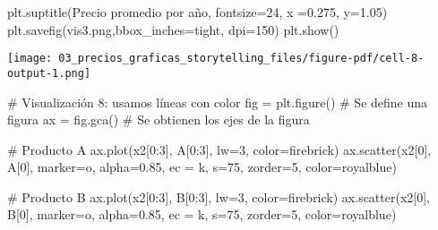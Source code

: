 \documentclass[
  letterpaper,
  DIV=11,
  numbers=noendperiod]{scrreprt}
\newenvironment{Shaded}{\begin{snugshade}}{\end{snugshade}}
\newcommand{\CommentTok}[1]{\textcolor[rgb]{0.37,0.37,0.37}{#1}}
\newcommand{\DecValTok}[1]{\textcolor[rgb]{0.68,0.00,0.00}{#1}}
\newcommand{\FloatTok}[1]{\textcolor[rgb]{0.68,0.00,0.00}{#1}}
\newcommand{\NormalTok}[1]{\textcolor[rgb]{0.00,0.23,0.31}{#1}}
\newcommand{\OperatorTok}[1]{\textcolor[rgb]{0.37,0.37,0.37}{#1}}
\newcommand{\StringTok}[1]{\textcolor[rgb]{0.13,0.47,0.30}{#1}}
\begin{document}
\begin{Shaded}
\begin{Highlighting}[]
\NormalTok{plt.suptitle(}\StringTok{\textquotesingle{}Precio promedio por año\textquotesingle{}}\NormalTok{, fontsize}\OperatorTok{=}\DecValTok{24}\NormalTok{, x }\OperatorTok{=}\FloatTok{0.275}\NormalTok{, y}\OperatorTok{=}\FloatTok{1.05}\NormalTok{)}
\NormalTok{plt.savefig(}\StringTok{\textquotesingle{}vis3.png\textquotesingle{}}\NormalTok{,bbox\_inches}\OperatorTok{=}\StringTok{\textquotesingle{}tight\textquotesingle{}}\NormalTok{, dpi}\OperatorTok{=}\DecValTok{150}\NormalTok{)}
\NormalTok{plt.show()}
\end{Highlighting}
\end{Shaded}

\texttt{[image: 03\_precios\_graficas\_storytelling\_files/figure-pdf/cell-8-output-1.png]}

\begin{Shaded}
\begin{Highlighting}[]
\CommentTok{\# Visualización 8: usamos líneas con color}
\NormalTok{fig }\OperatorTok{=}\NormalTok{ plt.figure() }\CommentTok{\# Se define una figura}
\NormalTok{ax }\OperatorTok{=}\NormalTok{ fig.gca()     }\CommentTok{\# Se obtienen los ejes de la figura}

\CommentTok{\# Producto A}
\NormalTok{ax.plot(x2[}\DecValTok{0}\NormalTok{:}\DecValTok{3}\NormalTok{], A[}\DecValTok{0}\NormalTok{:}\DecValTok{3}\NormalTok{], lw}\OperatorTok{=}\DecValTok{3}\NormalTok{, color}\OperatorTok{=}\StringTok{\textquotesingle{}firebrick\textquotesingle{}}\NormalTok{)}
\NormalTok{ax.scatter(x2[}\DecValTok{0}\NormalTok{], A[}\DecValTok{0}\NormalTok{], marker}\OperatorTok{=}\StringTok{\textquotesingle{}o\textquotesingle{}}\NormalTok{, alpha}\OperatorTok{=}\FloatTok{0.85}\NormalTok{, ec }\OperatorTok{=} \StringTok{\textquotesingle{}k\textquotesingle{}}\NormalTok{, s}\OperatorTok{=}\DecValTok{75}\NormalTok{, zorder}\OperatorTok{=}\DecValTok{5}\NormalTok{, color}\OperatorTok{=}\StringTok{\textquotesingle{}royalblue\textquotesingle{}}\NormalTok{)}

\CommentTok{\# Producto B}
\NormalTok{ax.plot(x2[}\DecValTok{0}\NormalTok{:}\DecValTok{3}\NormalTok{], B[}\DecValTok{0}\NormalTok{:}\DecValTok{3}\NormalTok{], lw}\OperatorTok{=}\DecValTok{3}\NormalTok{, color}\OperatorTok{=}\StringTok{\textquotesingle{}firebrick\textquotesingle{}}\NormalTok{)}
\NormalTok{ax.scatter(x2[}\DecValTok{0}\NormalTok{], B[}\DecValTok{0}\NormalTok{], marker}\OperatorTok{=}\StringTok{\textquotesingle{}o\textquotesingle{}}\NormalTok{, alpha}\OperatorTok{=}\FloatTok{0.85}\NormalTok{, ec }\OperatorTok{=} \StringTok{\textquotesingle{}k\textquotesingle{}}\NormalTok{, s}\OperatorTok{=}\DecValTok{75}\NormalTok{, zorder}\OperatorTok{=}\DecValTok{5}\NormalTok{, color}\OperatorTok{=}\StringTok{\textquotesingle{}royalblue\textquotesingle{}}\NormalTok{)}


\end{Highlighting}
\end{Shaded}
\end{document}
